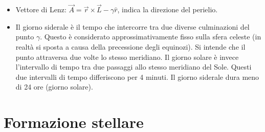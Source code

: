 \documentclass[11pt,a4paper]{article}
\begin{document}
\begin{itemize}
\item Vettore di Lenz: $\vec{A} = \vec{r} \times \vec{L} - \gamma \hat{r}$, indica la direzione del perielio.

\item Il giorno siderale è il tempo che intercorre tra due diverse culminazioni del punto $\gamma$. Questo è considerato approssimativamente fisso sulla sfera celeste (in realtà si sposta a causa della precessione degli equinozi). Si intende che il punto attraversa due volte lo stesso meridiano. Il giorno solare è invece l'intervallo di tempo tra due passaggi allo stesso meridiano del Sole. Questi due intervalli di tempo differiscono per 4 minuti. Il giorno siderale dura meno di 24 ore (giorno solare).
\end{itemize}

\section{Formazione stellare}
\end{document}
